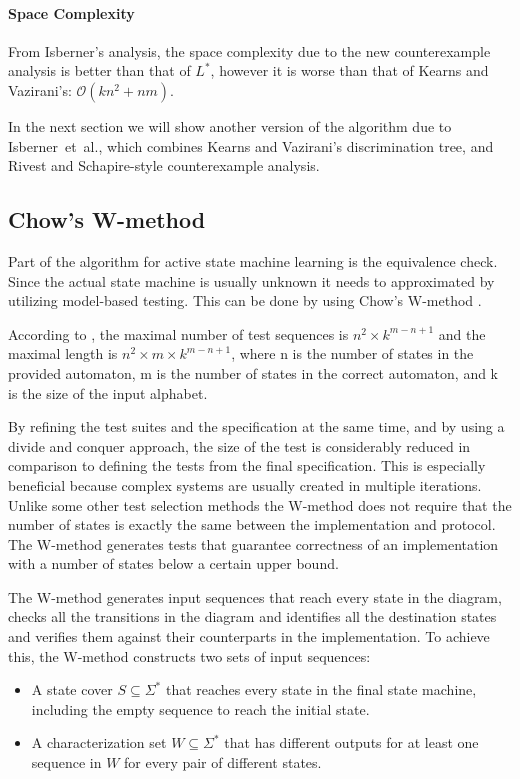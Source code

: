 \documentclass[multi,crop=false,class=article]{standalone}
\begin{document}
\paragraph{Space Complexity} From Isberner's analysis\cite{Isberner14b}, the
space complexity due to the new counterexample analysis is better than that of
$L^*$, however it is worse than that of Kearns and Vazirani's:
$\mathcal{O}(kn^2 + nm)$.

In the next section we will show another version of the algorithm due to
Isberner~et~al., which combines Kearns and Vazirani's discrimination tree, and
Rivest and Schapire-style counterexample analysis.

\subsection{Chow's W-method}
\label{sec:chow}
Part of the algorithm for active state machine learning is the equivalence check.
Since the actual state machine is usually unknown it needs to approximated by
utilizing model-based testing.
This can be done by using Chow's W-method \cite{deRuiter15, Chow78}.

According to \cite{vasilevskii73}, the maximal number of test sequences is 
$n^{2} \times k^{m-n+1}$ and the maximal length is $n^{2} \times m \times k^{m-n+1}$,
where n is the number of states in the provided automaton, m is the number
of states in the correct automaton, and k is the size of the input alphabet.

By refining the test suites and the specification at the same time,
and by using a divide and conquer approach, the size of the test is
considerably reduced in comparison to defining the tests from
the final specification\cite{Ipate07}.
This is especially beneficial because complex systems are usually
created in multiple iterations.
Unlike some other test selection methods the W-method does not require
that the number of states is exactly the same between
the implementation and protocol.
The W-method generates tests that guarantee correctness of an
implementation with a number of states below a certain upper bound.

The W-method generates input sequences that reach every state in the
diagram, checks all the transitions in the diagram and identifies all the
destination states and verifies them against their counterparts in
the implementation\cite{Ipate07}.
To achieve this, the W-method constructs two sets of input sequences:
\begin{itemize}
  \item A state cover $S \subseteq \Sigma^{*}$ that reaches every state in the
    final state machine, including the empty sequence to reach the initial state.
  \item A characterization set $W \subseteq \Sigma^{*}$ that has different
    outputs for at least one sequence in $W$ for every pair of different states.
\end{itemize}
\end{document}
